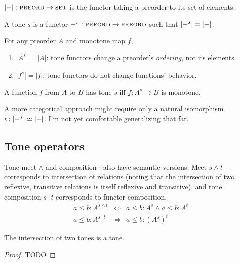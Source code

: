 \documentclass{rntz}
\newcommand{\todo}[1]{{\color{red}#1}}
\newcommand{\isoto}{\simeq}
\newcommand{\tc}{\cdot}                 %
\begin{document}
\begin{definition}
  $|{-}| : \textsc{preord} \to \textsc{set}$ is the functor taking a preorder to its set of
  elements.
\end{definition}

\begin{definition}\label{def:tone}
  A tone $s$ is a functor $-^s : \textsc{preord} \to \textsc{preord}$ such that $|{-^s}| =
  |{-}|$.
\end{definition}

\begin{corollary}
  For any preorder $A$ and monotone map $f$,
  \begin{enumerate}
  \item $|A^s| = |A|$: tone functors change a preorder's \emph{ordering}, not its
    elements.
  \item $|f^s| = |f|$: tone functors do not change functions' behavior.
  \end{enumerate}
\end{corollary}

\begin{definition}
  A function $f$ from $A$ to $B$ has tone $s$ iff $f : A^s \to B$ is monotone.
\end{definition}

A more categorical approach might require only a natural isomorphism \(\iota :
\elemset{-^s} \isoto \elemsetfn\). I'm not yet comfortable generalizing that
far.

\subsection{Tone operators}

Tone meet $\wedge$ and composition $\tc$ also have semantic versions. Meet $s
\wedge t$ corresponds to intersection of relations (noting that the intersection
of two reflexive, transitive relations is itself reflexive and transitive), and
tone composition $s \tc t$ corresponds to functor composition.
%
\begin{eqnarray*}
  a \le b : A^{s \wedge t} %
  &\iff& a \le b : A^s \wedge a \le b : A^t\\
  a \le b : A^{s \tc t} &\iff& a \le b : (A^s)^t
\end{eqnarray*}

\begin{conjecture}
  The intersection of two tones is a tone.
\end{conjecture}
\begin{proof}
  \todo{TODO}
\end{proof}
\end{document}
